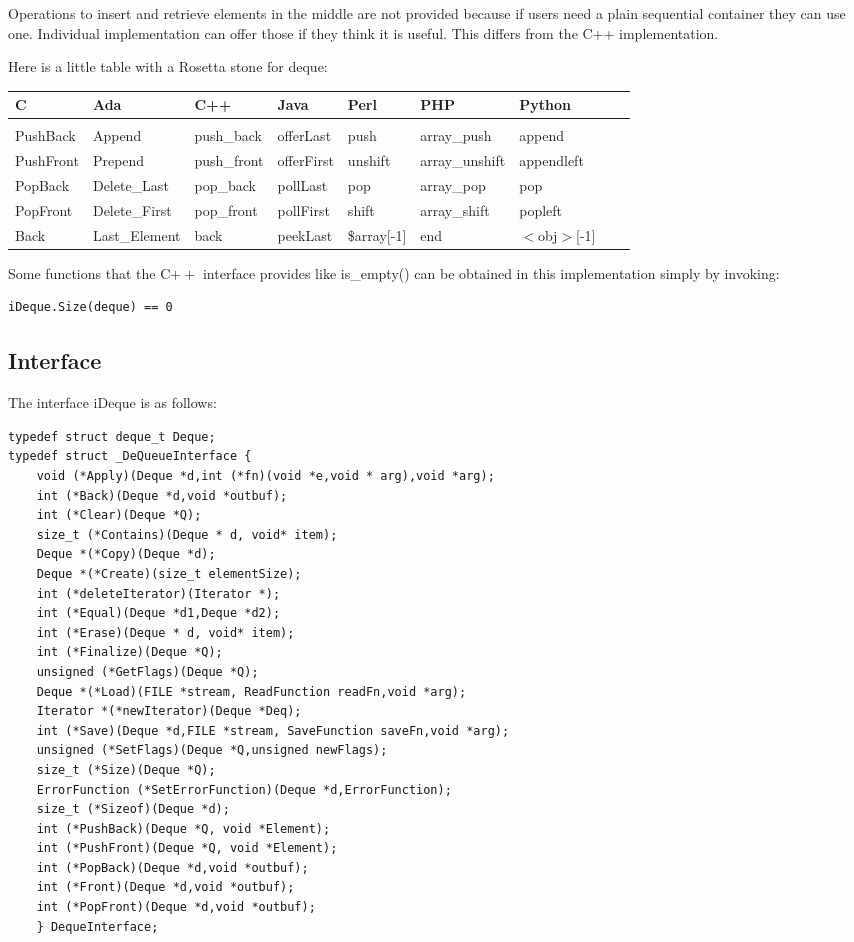 \documentclass[12pt,a4paper]{memoir} %
\begin{document}
{{Operations to insert and retrieve elements in the middle are not provided because if users need a plain sequential container they can use one. Individual implementation can offer those if they think it is useful. This differs from the C++ implementation.

Here is a little table with a Rosetta stone for deque:
\par
\noindent
{\footnotesize
\begin{tabular} {l l l l l l l l l}
C & Ada & C++ & Java & Perl & PHP & Python 
\\
\hline
\\
PushBack & Append & push\_back & offerLast & push & array\_push & append 
\\
PushFront & Prepend & push\_front & offerFirst & unshift & array\_unshift & appendleft 
\\
PopBack & Delete\_Last & pop\_back & pollLast & pop & array\_pop & pop 
\\
PopFront & Delete\_First & pop\_front & pollFirst & shift & array\_shift & popleft 
\\
Back & Last\_Element & back & peekLast & \$array[-1] & end & $<$obj$>$[-1]  
\end{tabular}
}
\par
Some functions that the C$++$ interface provides like is\_empty() can be obtained in this implementation simply by invoking:
\begin{verbatim}
iDeque.Size(deque) == 0
\end{verbatim}
\subsection{Interface}
The interface iDeque is as follows:
\begin{verbatim}
typedef struct deque_t Deque;
typedef struct _DeQueueInterface {
    void (*Apply)(Deque *d,int (*fn)(void *e,void * arg),void *arg);
    int (*Back)(Deque *d,void *outbuf);
    int (*Clear)(Deque *Q);
    size_t (*Contains)(Deque * d, void* item);
    Deque *(*Copy)(Deque *d);
    Deque *(*Create)(size_t elementSize);
    int (*deleteIterator)(Iterator *);
    int (*Equal)(Deque *d1,Deque *d2);
    int (*Erase)(Deque * d, void* item);
    int (*Finalize)(Deque *Q);
    unsigned (*GetFlags)(Deque *Q);
    Deque *(*Load)(FILE *stream, ReadFunction readFn,void *arg);
    Iterator *(*newIterator)(Deque *Deq);
    int (*Save)(Deque *d,FILE *stream, SaveFunction saveFn,void *arg);
    unsigned (*SetFlags)(Deque *Q,unsigned newFlags);
    size_t (*Size)(Deque *Q);
    ErrorFunction (*SetErrorFunction)(Deque *d,ErrorFunction); 
    size_t (*Sizeof)(Deque *d);
    int (*PushBack)(Deque *Q, void *Element);
    int (*PushFront)(Deque *Q, void *Element);
    int (*PopBack)(Deque *d,void *outbuf);
    int (*Front)(Deque *d,void *outbuf);
    int (*PopFront)(Deque *d,void *outbuf);
    } DequeInterface;


\end{verbatim}}}
\end{document}
